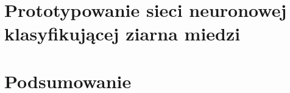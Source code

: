 \documentclass[a4paper, 12pt]{report}
\begin{document}
\chapter{Prototypowanie sieci neuronowej klasyfikującej ziarna miedzi}


\chapter{Podsumowanie} \label{ch:summary}


\begin{appendices}

\end{appendices}

\newpage

\listoffigures
\listoftables
\listoflistings

\nocite{*}


\end{document}
